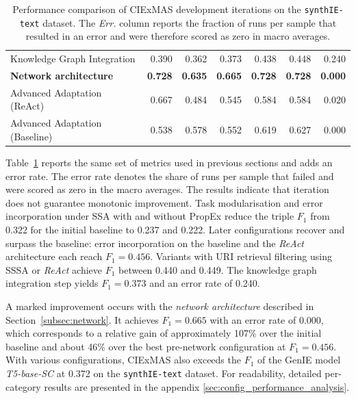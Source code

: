 \documentclass[a4paper,oneside,bibliography=totoc]{scrbook}
\begin{document}
\begin{table}[h]
\begin{tabular}{p{5cm}|rrrrrr}
    Knowledge Graph Integration                  & 0.390                                         & 0.362          & 0.373          & 0.438          & 0.448          & 0.240          \\
    \textbf{Network architecture}                & \textbf{0.728}                                & \textbf{0.635} & \textbf{0.665} & \textbf{0.728} & \textbf{0.728} & \textbf{0.000} \\
    Advanced Adaptation (ReAct)                  & 0.667                                         & 0.484          & 0.545          & 0.584          & 0.584          & 0.020          \\
    Advanced Adaptation (Baseline)               & 0.538                                         & 0.578          & 0.552          & 0.619          & 0.627          & 0.000          \\
    \bottomrule
  \end{tabular}
  \caption{Performance comparison of CIExMAS development iterations on the \texttt{synthIE\allowbreak-text} dataset. The \emph{Err.} column reports the fraction of runs per sample that resulted in an error and were therefore scored as zero in macro averages.}
  \label{tab:evaluation_iterations}
\end{table}

Table~\ref{tab:evaluation_iterations} reports the same set of metrics used in previous sections and adds an error rate. The error rate denotes the share of runs per sample that failed and were scored as zero in the macro averages. The results indicate that iteration does not guarantee monotonic improvement. Task modularisation and error incorporation under \ac{SSA} with and without \ac{PropEx} reduce the triple $F_1$ from 0.322 for the initial baseline to 0.237 and 0.222. Later configurations recover and surpass the baseline: error incorporation on the baseline and the \textit{ReAct} architecture each reach $F_1=0.456$. Variants with URI retrieval filtering using \ac{SSSA} or \textit{ReAct} achieve $F_1$ between 0.440 and 0.449. The knowledge graph integration step yields $F_1=0.373$ and an error rate of 0.240.

A marked improvement occurs with the \textit{network architecture} described in Section~\ref{subsec:network}. It achieves $F_1=0.665$ with an error rate of 0.000, which corresponds to a relative gain of approximately 107\% over the initial baseline and about 46\% over the best pre-network configuration at $F_1=0.456$. With various configurations, CIExMAS also exceeds the $F_1$ of the GenIE model \textit{T5-base-SC} at 0.372 on the \texttt{synthIE-text} dataset. For readability, detailed per-category results are presented in the appendix \ref{sec:config_performance_analysis}.
\end{document}
